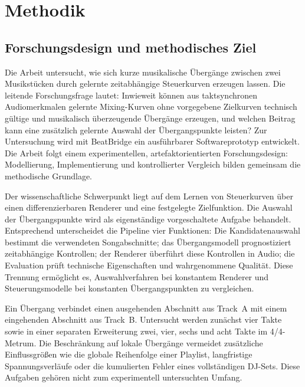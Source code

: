 \providecommand{\methodikoffen}[1]{\par\smallskip\noindent\textit{Noch zu ergänzen: #1}\par\smallskip}

\section{Methodik}
\label{sec:methodik}

\subsection{Forschungsdesign und methodisches Ziel}
\label{sec:methodik-design}

Die Arbeit untersucht, wie sich kurze musikalische Übergänge zwischen zwei Musikstücken durch gelernte zeitabhängige Steuerkurven erzeugen lassen. Die leitende Forschungsfrage lautet: Inwieweit können aus taktsynchronen Audiomerkmalen gelernte Mixing-Kurven ohne vorgegebene Zielkurven technisch gültige und musikalisch überzeugende Übergänge erzeugen, und welchen Beitrag kann eine zusätzlich gelernte Auswahl der Übergangspunkte leisten? Zur Untersuchung wird mit BeatBridge ein ausführbarer Softwareprototyp entwickelt. Die Arbeit folgt einem experimentellen, artefaktorientierten Forschungsdesign: Modellierung, Implementierung und kontrollierter Vergleich bilden gemeinsam die methodische Grundlage.

Der wissenschaftliche Schwerpunkt liegt auf dem Lernen von Steuerkurven über einen differenzierbaren Renderer und eine festgelegte Zielfunktion. Die Auswahl der Übergangspunkte wird als eigenständige vorgeschaltete Aufgabe behandelt. Entsprechend unterscheidet die Pipeline vier Funktionen: Die Kandidatenauswahl bestimmt die verwendeten Songabschnitte; das Übergangsmodell prognostiziert zeitabhängige Kontrollen; der Renderer überführt diese Kontrollen in Audio; die Evaluation prüft technische Eigenschaften und wahrgenommene Qualität. Diese Trennung ermöglicht es, Auswahlverfahren bei konstantem Renderer und Steuerungsmodelle bei konstanten Übergangspunkten zu vergleichen.

Ein Übergang verbindet einen ausgehenden Abschnitt aus Track~A mit einem eingehenden Abschnitt aus Track~B. Untersucht werden zunächst vier Takte sowie in einer separaten Erweiterung zwei, vier, sechs und acht Takte im 4/4-Metrum. Die Beschränkung auf lokale Übergänge vermeidet zusätzliche Einflussgrößen wie die globale Reihenfolge einer Playlist, langfristige Spannungsverläufe oder die kumulierten Fehler eines vollständigen DJ-Sets. Diese Aufgaben gehören nicht zum experimentell untersuchten Umfang.

